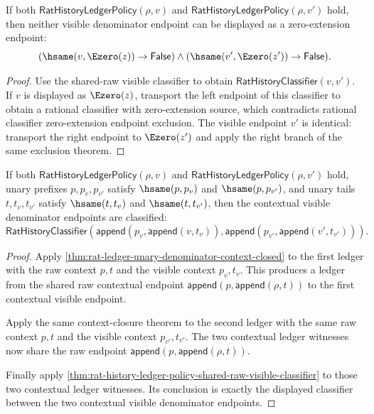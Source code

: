 \begin{theorem}
\label{thm:rat-ledger-shared-visible-zero-extension-exclusion}
If both $\mathsf{RatHistoryLedgerPolicy}(\rho,v)$ and
$\mathsf{RatHistoryLedgerPolicy}(\rho,v')$ hold, then neither visible
denominator endpoint can be displayed as a zero-extension endpoint:
$$
(\hsame(v,\Ezero(z))\to\mathsf{False})\land
(\hsame(v',\Ezero(z'))\to\mathsf{False}).
$$
\end{theorem}
\begin{proof}
Use the shared-raw visible classifier to obtain
$\mathsf{RatHistoryClassifier}(v,v')$. If $v$ is displayed as $\Ezero(z)$,
transport the left endpoint of this classifier to obtain a rational classifier
with zero-extension source, which contradicts rational classifier
zero-extension endpoint exclusion. The visible endpoint $v'$ is identical:
transport the right endpoint to $\Ezero(z')$ and apply the right branch of the
same exclusion theorem.
\end{proof}

\begin{theorem}
\label{thm:rat-history-ledger-shared-raw-context-visible-classifier}
If both $\mathsf{RatHistoryLedgerPolicy}(\rho,v)$ and
$\mathsf{RatHistoryLedgerPolicy}(\rho,v')$ hold, unary prefixes $p,p_v,p_{v'}$
satisfy $\hsame(p,p_v)$ and $\hsame(p,p_{v'})$, and unary tails
$t,t_v,t_{v'}$ satisfy $\hsame(t,t_v)$ and $\hsame(t,t_{v'})$, then the
contextual visible denominator endpoints are classified:
$$
\mathsf{RatHistoryClassifier}(\mathsf{append}(p_v,\mathsf{append}(v,t_v)),
\mathsf{append}(p_{v'},\mathsf{append}(v',t_{v'}))).
$$
\end{theorem}
\begin{proof}
Apply \autoref{thm:rat-ledger-unary-denominator-context-closed} to the first
ledger with the raw context $p,t$ and the visible context $p_v,t_v$. This
produces a ledger from the shared raw contextual endpoint
$\mathsf{append}(p,\mathsf{append}(\rho,t))$ to the first contextual visible
endpoint.

Apply the same context-closure theorem to the second ledger with the same raw
context $p,t$ and the visible context $p_{v'},t_{v'}$. The two contextual
ledger witnesses now share the raw endpoint
$\mathsf{append}(p,\mathsf{append}(\rho,t))$.

Finally apply
\autoref{thm:rat-history-ledger-policy-shared-raw-visible-classifier} to those
two contextual ledger witnesses. Its conclusion is exactly the displayed
classifier between the two contextual visible denominator endpoints.
\end{proof}

